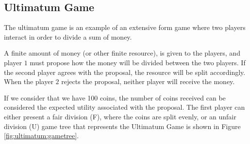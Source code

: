 \clearpage
\subsection{Ultimatum Game}
\label{subsec:ultimatumquantum}





The ultimatum game is an example of an extensive form game where two players interact in order to divide a sum of money.

A finite amount of money (or other finite resource), is given to the players, and player $1$ must propose how the money will be divided between the two players. If the second player agrees with the proposal, the resource will be split accordingly. When the player $2$ rejects the proposal, neither player will receive the money.

If we consider that we have 100 coins, the number of coins received can be considered the expected utility associated with the proposal. The first player can either present a fair division (F), where the coins are split evenly, or an unfair division (U) game tree that represents the Ultimatum Game is shown in Figure \ref{fig:ultimatum:gametree}.

